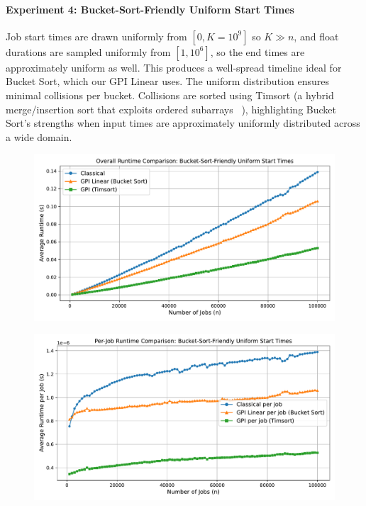 \documentclass[final,5p,times]{elsarticle}
\begin{document}
\paragraph{Experiment 4: Bucket-Sort-Friendly Uniform Start Times}
Job start times are drawn uniformly from $[0, K=10^9]$ so $K \gg n$, and float durations are sampled uniformly from $[1, 10^6]$, so the end times are approximately uniform as well. This produces a well-spread timeline ideal for Bucket Sort, which our GPI Linear uses. The uniform distribution ensures minimal collisions per bucket. Collisions are sorted using Timsort (a hybrid merge/insertion sort that exploits ordered subarrays ~\cite{timsort2002}), highlighting Bucket Sort's strengths when input times are approximately uniformly distributed across a wide domain.
\vspace{-1em}
\begin{figure}[H]
    \centering
    \includegraphics[width=\linewidth]{figures/Bucket-Sort-Friendly_Uniform_Start_Times_runtime_total.pdf}
    \label{fig:exp4-runtime-total}
\end{figure}
\vspace{-2.5em}
\begin{figure}[H]
    \includegraphics[width=\linewidth]{figures/Bucket-Sort-Friendly_Uniform_Start_Times_runtime_per_job.pdf}
    \label{fig:exp4-runtime-per-job}
\end{figure}
\vspace{-3em}
\end{document}
